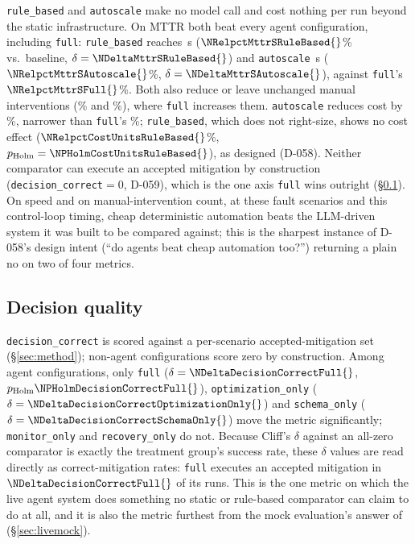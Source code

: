 \texttt{rule\_based} and \texttt{autoscale} make no model call and cost nothing per run beyond the
static infrastructure. On MTTR both beat every agent configuration, including \texttt{full}:
\texttt{rule\_based} reaches \NMttrRuleBasedMedian{}\,s ($\NRelpctMttrSRuleBased{}$\% vs.\ baseline,
$\delta=\NDeltaMttrSRuleBased{}$) and \texttt{autoscale} \NMttrAutoscaleMedian{}\,s
($\NRelpctMttrSAutoscale{}$\%, $\delta=\NDeltaMttrSAutoscale{}$), against \texttt{full}'s
$\NRelpctMttrSFull{}$\%. Both also reduce or leave unchanged manual interventions
(\NRelpctManualInterventionsRuleBased{}\% and \NRelpctManualInterventionsAutoscale{}\%), where
\texttt{full} increases them. \texttt{autoscale} reduces cost by \NRelpctCostUnitsAutoscale{}\%,
narrower than \texttt{full}'s \NRelpctCostUnitsFull{}\%; \texttt{rule\_based}, which does not
right-size, shows no cost effect ($\NRelpctCostUnitsRuleBased{}$\%, $p_{\mathrm{Holm}}=\NPHolmCostUnitsRuleBased{}$),
as designed (D-058). Neither comparator can execute an accepted mitigation by construction
(\texttt{decision\_correct}$=0$, D-059), which is the one axis \texttt{full} wins outright
(\S\ref{sec:decision}). On speed and on manual-intervention count, at these fault scenarios and this
control-loop timing, cheap deterministic automation beats the LLM-driven system it was built to be
compared against; this is the sharpest instance of D-058's design intent (``do agents beat cheap
automation too?'') returning a plain no on two of four metrics.

\subsection{Decision quality}\label{sec:decision}

\texttt{decision\_correct} is scored against a per-scenario accepted-mitigation set
(\S\ref{sec:method}); non-agent configurations score zero by construction. Among agent configurations,
only \texttt{full} ($\delta=\NDeltaDecisionCorrectFull{}$, $p_{\mathrm{Holm}}\NPHolmDecisionCorrectFull{}$),
\texttt{optimization\_only} ($\delta=\NDeltaDecisionCorrectOptimizationOnly{}$) and
\texttt{schema\_only} ($\delta=\NDeltaDecisionCorrectSchemaOnly{}$) move the metric significantly;
\texttt{monitor\_only} and \texttt{recovery\_only} do not. Because Cliff's $\delta$ against an
all-zero comparator is exactly the treatment group's success rate, these $\delta$ values are read
directly as correct-mitigation rates: \texttt{full} executes an accepted mitigation in
$\NDeltaDecisionCorrectFull{}$ of its runs. This is the one metric on which the live agent system does
something no static or rule-based comparator can claim to do at all, and it is also the metric
furthest from the mock evaluation's answer of \NLiveVsMockDecisionCorrectMock{} (\S\ref{sec:livemock}).

